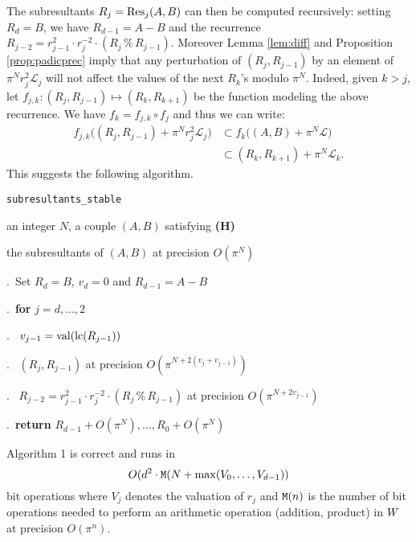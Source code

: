 \documentclass{article}
\DeclareMathOperator{\val}{val}
\begin{document}
\noindent
The subresultants $R_j = \text{\rm Res}_j(A,B)$ can then be computed recursively:
setting $R_d = B$, we have $R_{d-1} = A-B$ and the recurrence
$R_{j-2} = r_{j-1}^2 \cdot r_j^{-2} \cdot (R_j \,\%\, R_{j-1})$.
Moreover Lemma \ref{lem:diff} and Proposition \ref{prop:padicprec} imply
that any perturbation of $(R_j, R_{j-1})$ by an element of $\pi^N r_j^2 
\mathcal L_j$ will not affect the values of the next $R_k$'s modulo 
$\pi^N$. Indeed, given $k > j$, let $f_{j,k} : (R_j, R_{j-1}) \mapsto 
(R_k, R_{k+1})$ be the function modeling the above recurrence. We have
$f_k = f_{j,k} \circ f_j$ and thus we can write:
\begin{align*}
f_{j,k}\big((R_j, R_{j-1}) + \pi^N r_j^2 \mathcal L_j\big) 
& \subset f_k\big((A,B) + \pi^N \mathcal L\big) \\
& \subset (R_k, R_{k+1}) + \pi^N \mathcal L_k.
\end{align*}
This suggests the following algorithm.

\noindent\hrulefill

 {\tt subresultants\_stable}

 an integer $N$, a couple $(A,B)$ satisfying {\bf (H)}

 the subresultants of $(A,B)$ at precision $O(\pi^N)$

\smallskip{}.\ Set $R_d = B$, $v_d = 0$ and $R_{d-1} = A-B$

\smallskip{}.\ {\bf for} $j=d,\dots,2$

\smallskip{}.\ \hspace{0.3cm}{\bf compute} $v_{j-1} = \val(\lc(R_{j-1}))$

\smallskip{}.\ \hspace{0.3cm}{\bf lift} $(R_j, R_{j-1})$ at precision $O(\pi^{N+2(v_j + v_{j-1})})$

\smallskip{}.\ \hspace{0.3cm}{\bf compute} $R_{j-2} = r_{j-1}^2 \cdot r_j^{-2} \cdot (R_j \,\%\, R_{j-1})$ at precision $O(\pi^{N+2 v_{j-1}})$

\smallskip{}.\ {\bf return} $R_{d-1} + O(\pi^N), \ldots,
R_0 + O(\pi^N)$

\vspace{-1ex}\noindent\hrulefill

\begin{prop}
Algorithm 1 is correct and runs in
$$O(d^2 \cdot \text{\tt M}(N + \max(V_0, \ldots, V_{d-1}))$$
bit operations where $V_j$ denotes the valuation of $r_j$ and 
$\text{\tt M}(n)$ is the number of bit operations needed to perform an 
arithmetic operation (addition, product) in $W$ at precision 
$O(\pi^n)$.
\end{prop}
\end{document}

